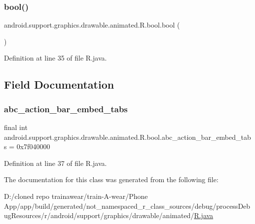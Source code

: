 \subsubsection{\texorpdfstring{bool()}{bool()}}
{\footnotesize\ttfamily android.\+support.\+graphics.\+drawable.\+animated.\+R.\+bool.\+bool (\begin{DoxyParamCaption}{ }\end{DoxyParamCaption})\hspace{0.3cm}{\ttfamily [private]}}



Definition at line 35 of file R.\+java.


\begin{DoxyCode}{0}

\end{DoxyCode}


\subsection{Field Documentation}
\mbox{\label{classandroid_1_1support_1_1graphics_1_1drawable_1_1animated_1_1_r_1_1bool_aa72a93d23c6382aab7e3917f72025bc7}} 
\subsubsection{\texorpdfstring{abc\_action\_bar\_embed\_tabs}{abc\_action\_bar\_embed\_tabs}}
{\footnotesize\ttfamily final int android.\+support.\+graphics.\+drawable.\+animated.\+R.\+bool.\+abc\+\_\+action\+\_\+bar\+\_\+embed\+\_\+tabs = 0x7f040000\hspace{0.3cm}{\ttfamily [static]}}



Definition at line 37 of file R.\+java.



The documentation for this class was generated from the following file\+:\begin{DoxyCompactItemize}
\item 
D\+:/cloned repo trainawear/train-\/\+A-\/wear/\+Phone App/app/build/generated/not\+\_\+namespaced\+\_\+r\+\_\+class\+\_\+sources/debug/process\+Debug\+Resources/r/android/support/graphics/drawable/animated/\mbox{\hyperlink{process_debug_resources_2r_2android_2support_2graphics_2drawable_2animated_2_r_8java}{R.\+java}}\end{DoxyCompactItemize}
